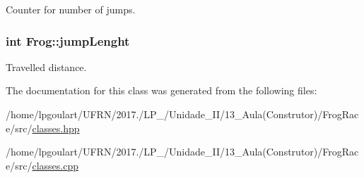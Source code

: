 Counter for number of jumps. 

\subsubsection[{\texorpdfstring{jump\+Lenght}{jumpLenght}}]{\setlength{\rightskip}{0pt plus 5cm}int Frog\+::jump\+Lenght\hspace{0.3cm}{\ttfamily [private]}}\hypertarget{classFrog_a8ce20ccfa8a10afc1465a2c60e33b53d}{}\label{classFrog_a8ce20ccfa8a10afc1465a2c60e33b53d}


Travelled distance. 



The documentation for this class was generated from the following files\+:\begin{DoxyCompactItemize}
\item 
/home/lpgoulart/\+U\+F\+R\+N/2017./\+L\+P\+\_/\+Unidade\+\_\+\+I\+I/13\+\_\+\+Aula(\+Construtor)/\+Frog\+Race/src/\hyperlink{classes_8hpp}{classes.\+hpp}\item 
/home/lpgoulart/\+U\+F\+R\+N/2017./\+L\+P\+\_/\+Unidade\+\_\+\+I\+I/13\+\_\+\+Aula(\+Construtor)/\+Frog\+Race/src/\hyperlink{classes_8cpp}{classes.\+cpp}\end{DoxyCompactItemize}
